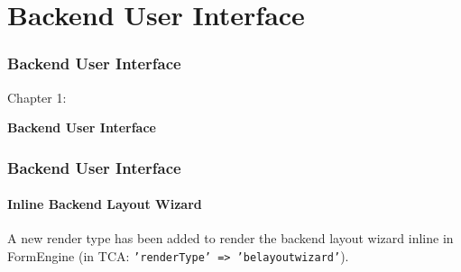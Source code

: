%

\section{Backend User Interface}
\begin{frame}[fragile]
	\frametitle{Backend User Interface}

	\begin{center}\huge{Chapter 1:}\end{center}
	\begin{center}\huge{\color{typo3darkgrey}\textbf{Backend User Interface}}\end{center}

\end{frame}

\begin{frame}[fragile]
	\frametitle{Backend User Interface}
	\framesubtitle{Inline Backend Layout Wizard}

	A new render type has been added to render the backend layout wizard inline in FormEngine
	(in TCA: \texttt{'renderType' => 'belayoutwizard'}).


\end{frame}


